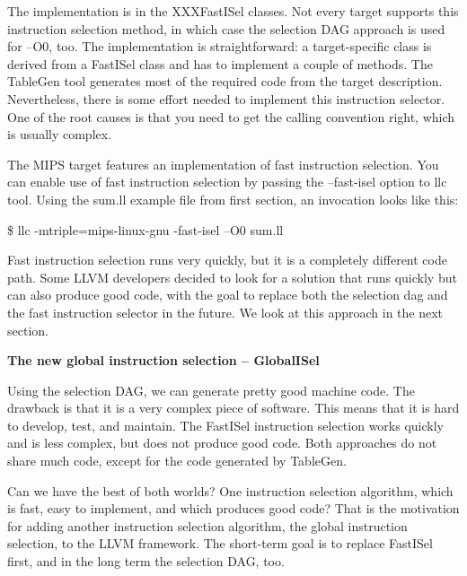 The implementation is in the XXXFastISel classes. Not every target supports this instruction selection method, in which case the selection DAG approach is used for –O0, too. The implementation is straightforward: a target-specific class is derived from a FastISel class and has to implement a couple of methods. The TableGen tool generates most of the required code from the target description. Nevertheless, there is some effort needed to implement this instruction selector. One of the root causes is that you need to get the calling convention right, which is usually complex.\par

The MIPS target features an implementation of fast instruction selection. You can enable use of fast instruction selection by passing the –fast-isel option to llc tool. Using the sum.ll example file from first section, an invocation looks like this:\par

\begin{tcolorbox}[colback=white,colframe=black]
\$ llc -mtriple=mips-linux-gnu -fast-isel –O0 sum.ll
\end{tcolorbox}

Fast instruction selection runs very quickly, but it is a completely different code path. Some LLVM developers decided to look for a solution that runs quickly but can also produce good code, with the goal to replace both the selection dag and the fast instruction selector in the future. We look at this approach in the next section.\par

\hspace*{\fill} \par %
\textbf{The new global instruction selection – GlobalISel}

Using the selection DAG, we can generate pretty good machine code. The drawback is that it is a very complex piece of software. This means that it is hard to develop, test, and maintain. The FastISel instruction selection works quickly and is less complex, but does not produce good code. Both approaches do not share much code, except for the code generated by TableGen.\par

Can we have the best of both worlds? One instruction selection algorithm, which is fast, easy to implement, and which produces good code? That is the motivation for adding another instruction selection algorithm, the global instruction selection, to the LLVM framework. The short-term goal is to replace FastISel first, and in the long term the selection DAG, too.\par

